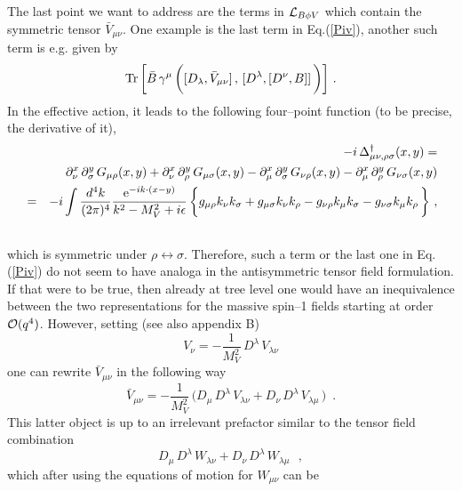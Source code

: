The last point we want to address are the terms in ${\cal L}_{B\phi V}$
which contain the symmetric tensor $\bar{V}_{\mu \nu}$. One example is
the last term in Eq.(\ref{Piv}), another such term is e.g. given by
\begin{equation}
{\rm Tr} \, \biggl[ \bar{B} \, \gamma^\mu \, \biggl( [ D_\lambda ,
\bar{V}_{\mu \nu} ] \, , \, [D^\lambda , [D^\nu , B] ] \, \biggl)
\biggl] \, \, .
\end{equation}
In the effective action, it leads to  the following
four--point function (to be precise, the derivative of it),
\begin{eqnarray}
& &- i \,\Delta^\dagger_{\mu \nu , \rho \sigma} (x,y) = \nonumber \\
& &\partial^x_\nu \, \partial^y_\sigma \, G_{\mu \rho}(x,y) +
\partial^x_\nu \, \partial^y_\rho \, G_{\mu \sigma}(x,y) -
\partial^x_\mu \, \partial^y_\sigma \, G_{\nu \rho}(x,y) -
\partial^x_\mu \, \partial^y_\rho \, G_{\nu \sigma}(x,y)  \nonumber \\
& =&-i \int \frac{d^4 k}{(2\pi)^4} \frac{{\rm e}^{-i k \cdot (x-y)}}{k^2
- M_V^2 + i\epsilon} \, \biggl\{ g_{\mu \rho}  k_\nu k_\sigma +
g_{\mu \sigma}  k_\nu k_\rho - g_{\nu \rho}  k_\mu k_\sigma -
g_{\nu \sigma}  k_\mu k_\rho \, \biggr\} \, \, ,\nonumber \\
& & \,
\end{eqnarray}
which is symmetric under $\rho \leftrightarrow \sigma$. Therefore,
such a term or the last one in Eq.(\ref{Piv}) do not seem to have analoga
in the antisymmetric tensor field formulation. If that were to be
true, then already at tree level one would have an inequivalence
between the two representations for the massive spin--1 fields starting
at order ${\cal O}(q^4)$. However, setting (see also appendix B)
\begin{equation}
V_\nu = - \frac{1}{M_V^2} \, D^\lambda \, V_{\lambda \nu}
\end{equation}
one can rewrite $\bar{V}_{\mu \nu}$ in the following way
\begin{equation}
\bar{V}_{\mu \nu} = - \frac{1}{M_V^2} \, \bigl( D_\mu \, D^\lambda \,
V_{\lambda \nu} +  D_\nu \, D^\lambda \, V_{\lambda \mu} \, \bigr)
\,\, \, .
\end{equation}
This latter object is up to an irrelevant prefactor similar to the
tensor field combination
\begin{equation}
 D_\mu \, D^\lambda \, W_{\lambda \nu} +
D_\nu \, D^\lambda \, W_{\lambda \mu} \, \,\, \, ,
\end{equation}
which after using the equations of motion for $W_{\mu \nu}$ can be
